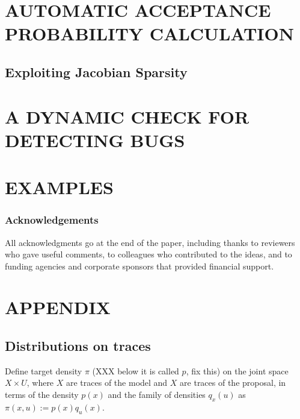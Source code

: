 \documentclass[twoside]{article}
\begin{document}
\section{AUTOMATIC ACCEPTANCE PROBABILITY CALCULATION}

\subsection{Exploiting Jacobian Sparsity}



\section{A DYNAMIC CHECK FOR DETECTING BUGS}


\section{EXAMPLES}


\subsubsection*{Acknowledgements}
All acknowledgments go at the end of the paper, including thanks to reviewers who gave useful comments, to colleagues who contributed to the ideas, and to funding agencies and corporate sponsors that provided financial support.

 

\clearpage
\onecolumn
\section*{APPENDIX}

\subsection{Distributions on traces}
Define target density $\pi$ (XXX below it is called $p$, fix this) on the joint space $X \times U$, where $X$ are traces of the model and $X$ are traces of the proposal, in terms of the density $p(x)$ and the family of densities $q_x(u)$ as $\pi(x, u) := p(x) q_u(x)$.
\end{document}
